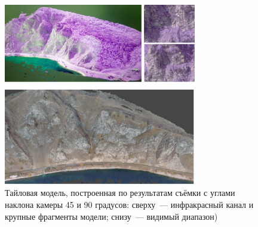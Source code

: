 \begin{figure}[H]
  \begin{center}
    \includegraphics[width=0.75\textwidth]{authors/efremov-fig3.jpg}
  \end{center}
  \caption{Тайловая модель, построенная по результатам съёмки с углами наклона камеры 45 и 90 градусов: сверху~--- инфракрасный канал и крупные фрагменты модели; снизу~--- видимый диапазон)}
  \label{fig:efremov-fig3}
\end{figure}

